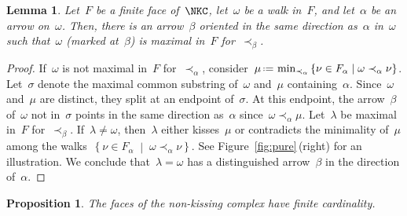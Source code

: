 \documentclass{amsart}
\newtheorem{proposition}[theorem]{Proposition}
\newtheorem{lemma}[theorem]{Lemma}
\theoremstyle{definition}
\newcommand{\set}[2]{\left\{ #1 \;\middle|\; #2 \right\}} %
\newcommand{\eqdef}{\mbox{\,\raisebox{0.2ex}{\scriptsize\ensuremath{\mathrm:}}\ensuremath{=}\,}} %
\newcommand{\fref}[1]{Figure~\ref{#1}} %
\begin{document}
\begin{lemma}\label{lemma: distinguished arrows exists}
Let~$F$ be a finite face of~$\NKC$, let~$\omega$ be a walk in~$F$, and let~$\alpha$ be an arrow on~$\omega$.
Then, there is an arrow~$\beta$ oriented in the same direction as~$\alpha$ in~$\omega$ such that~$\omega$ (marked at~$\beta$) is maximal in~$F$ for~$\prec_\beta$.
\end{lemma}

\begin{proof}
If~$\omega$ is not maximal in~$F$ for~$\prec_\alpha$, consider~${\mu \eqdef \min_{\prec_\alpha} \set{\nu \in F_\alpha}{\omega \prec_\alpha \nu}}$.
Let~$\sigma$ denote the maximal common substring of~$\omega$ and~$\mu$ containing~$\alpha$.
Since~$\omega$ and~$\mu$ are distinct, they split at an endpoint of~$\sigma$.
At this endpoint, the arrow~$\beta$ of~$\omega$ not in~$\sigma$ points in the same direction as~$\alpha$ since~$\omega \prec_\alpha \mu$.
Let~$\lambda$ be maximal in~$F$ for~$\prec_\beta$.
If~$\lambda \ne \omega$, then~$\lambda$ either kisses~$\mu$ or contradicts the minimality of~$\mu$ among the walks~$\set{\nu \in F_\alpha}{\omega \prec_\alpha \nu}$.
See \fref{fig:pure}\,(right) for an illustration.
We conclude that~$\lambda = \omega$ has a distinguished arrow~$\beta$ in the direction of~$\alpha$.
\end{proof}

\begin{proposition}\label{prop: nk facets are finite}
The faces of the non-kissing complex have finite cardinality.
\end{proposition}
\end{document}
